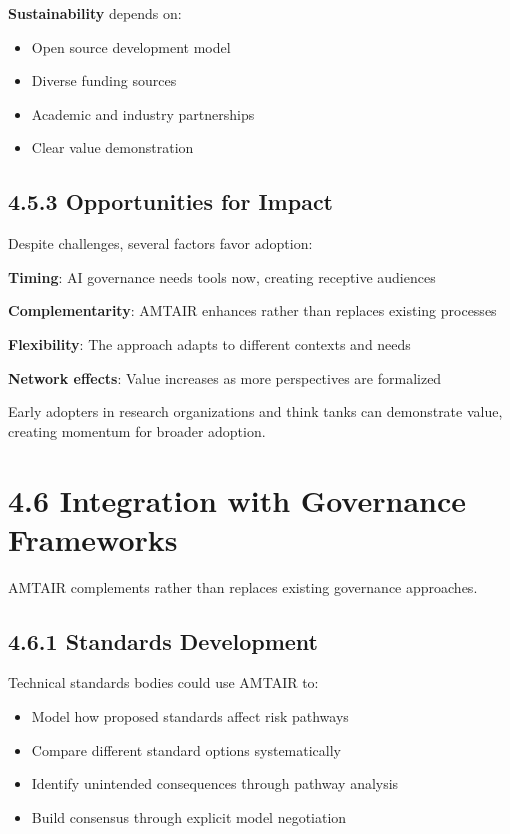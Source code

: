 \documentclass[
  11pt,
  letterpaper,
]{book}
\providecommand{\tightlist}{%
  \setlength{\itemsep}{0pt}\setlength{\parskip}{0pt}}
\begin{document}
\textbf{Sustainability} depends on:

\begin{itemize}
\tightlist
\item
  Open source development model
\item
  Diverse funding sources
\item
  Academic and industry partnerships
\item
  Clear value demonstration
\end{itemize}

\subsection{4.5.3 Opportunities for
Impact}\label{sec-impact-opportunities}

Despite challenges, several factors favor adoption:

\textbf{Timing}: AI governance needs tools now, creating receptive
audiences

\textbf{Complementarity}: AMTAIR enhances rather than replaces existing
processes

\textbf{Flexibility}: The approach adapts to different contexts and
needs

\textbf{Network effects}: Value increases as more perspectives are
formalized

Early adopters in research organizations and think tanks can demonstrate
value, creating momentum for broader adoption.

\section{4.6 Integration with Governance
Frameworks}\label{sec-governance-integration}

AMTAIR complements rather than replaces existing governance approaches.

\subsection{4.6.1 Standards
Development}\label{sec-standards-integration}

Technical standards bodies could use AMTAIR to:

\begin{itemize}
\tightlist
\item
  Model how proposed standards affect risk pathways
\item
  Compare different standard options systematically
\item
  Identify unintended consequences through pathway analysis
\item
  Build consensus through explicit model negotiation
\end{itemize}
\end{document}
